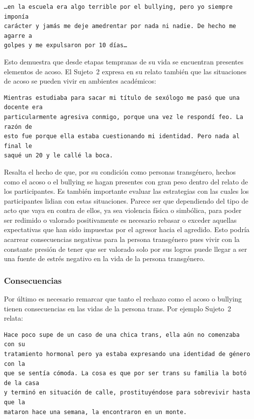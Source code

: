 \begin{verbatim}
…en la escuela era algo terrible por el bullying, pero yo siempre imponía
carácter y jamás me deje amedrentar por nada ni nadie. De hecho me agarre a
golpes y me expulsaron por 10 días…
\end{verbatim}

Esto demuestra que desde etapas tempranas de su vida se encuentran presentes
elementos de acoso. El Sujeto~2 expresa en su relato también que las situaciones
de acoso se pueden vivir en ambientes académicos:

\begin{verbatim}
Mientras estudiaba para sacar mi título de sexólogo me pasó que una docente era
particularmente agresiva conmigo, porque una vez le respondí feo. La razón de
esto fue porque ella estaba cuestionando mi identidad. Pero nada al final le
saqué un 20 y le callé la boca.
\end{verbatim}

Resalta el hecho de que, por su condición como personas transgénero, hechos como
el acoso o el bullying se hagan presentes con gran peso dentro del relato de los
participantes. Es también importante evaluar las estrategias con las cuales los
participantes lidian con estas situaciones. Parece ser que dependiendo del tipo
de acto que vaya en contra de ellos, ya sea violencia física o simbólica, para
poder ser redimido o valorado positivamente es necesario rebasar o exceder
aquellas expectativas que han sido impuestas por el agresor hacia el agredido.
Esto podría acarrear consecuencias negativas para la persona transgénero pues
vivir con la constante presión de tener que ser valorado solo por sus logros
puede llegar a ser una fuente de estrés negativo en la vida de la persona
transgénero.

\subsubsection{Consecuencias}

Por último es necesario remarcar que tanto el rechazo como el acoso o bullying
tienen consecuencias en las vidas de la persona trans. Por ejemplo Sujeto~2
relata:

\begin{verbatim}
Hace poco supe de un caso de una chica trans, ella aún no comenzaba con su
tratamiento hormonal pero ya estaba expresando una identidad de género con la
que se sentía cómoda. La cosa es que por ser trans su familia la botó de la casa
y terminó en situación de calle, prostituyéndose para sobrevivir hasta que la
mataron hace una semana, la encontraron en un monte.
\end{verbatim}

